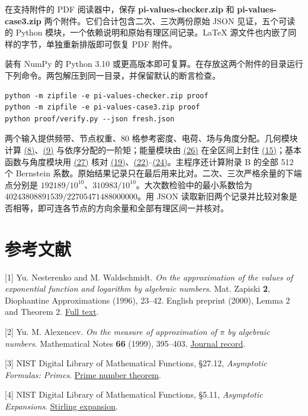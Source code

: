 \documentclass[11pt,a4paper]{article}
\begin{document}
在支持附件的 PDF 阅读器中，保存 \textbf{pi-values-checker.zip} 和 \textbf{pi-values-case3.zip} 两个附件。它们合计包含二次、三次两份原始 JSON 见证，五个可读的 Python 模块，一个依赖说明和原始有理区间记录。LaTeX 源文件也内嵌了同样的字节，单独重新排版即可恢复 PDF 附件。

装有 NumPy 的 Python 3.10 或更高版本即可复算。在存放这两个附件的目录运行下列命令。两包解压到同一目录，并保留默认的断言检查。

\begin{verbatim}
python -m zipfile -e pi-values-checker.zip proof
python -m zipfile -e pi-values-case3.zip proof
python proof/verify.py --json fresh.json
\end{verbatim}

两个输入提供频带、节点权重、80 格参考密度、电荷、场与角度分配。几何模块计算 \hyperref[eq:8]{(8)}、\hyperref[eq:9]{(9)} 与依序分配的一阶矩；能量模块由 \hyperref[eq:26]{(26)} 在全区间上封住 \hyperref[eq:15]{(15)}；基本函数与角度模块用 \hyperref[eq:27]{(27)} 核对 \hyperref[eq:19]{(19)}、\hyperref[eq:22]{(22)}--\hyperref[eq:24]{(24)}。主程序还计算附录 B 的全部 512 个 Bernstein 系数。原始结果记录只在最后用来比对。二次、三次严格余量的下端点分别是 \(192189/10^{10}\)、\(310983/10^{10}\)。大次数检验中的最小系数恰为 \(40243808891539/22705471488000000\)。用 JSON 读取新旧两个记录并比较对象是否相等，即可连各节点的方向余量和全部有理区间一并核对。

\section{参考文献}\label{ux53c2ux8003ux6587ux732e}

{[}1{]} Yu. Nesterenko and M. Waldschmidt. \emph{On the approximation of the values of exponential function and logarithm by algebraic numbers}. Mat. Zapiski \textbf{2}, Diophantine Approximations (1996), 23--42. English preprint (2000), Lemma 2 and Theorem 2. \href{https://arxiv.org/pdf/math/0002047}{Full text}.

{[}2{]} Yu. M. Alexencev. \emph{On the measure of approximation of \(\pi\) by algebraic numbers}. Mathematical Notes \textbf{66} (1999), 395--403. \href{https://www.mathnet.ru/eng/mzm1191}{Journal record}.

{[}3{]} NIST Digital Library of Mathematical Functions, §27.12, \emph{Asymptotic Formulas: Primes}. \href{https://dlmf.nist.gov/27.12}{Prime number theorem}.

{[}4{]} NIST Digital Library of Mathematical Functions, §5.11, \emph{Asymptotic Expansions}. \href{https://dlmf.nist.gov/5.11.E1}{Stirling expansion}.
\end{document}
